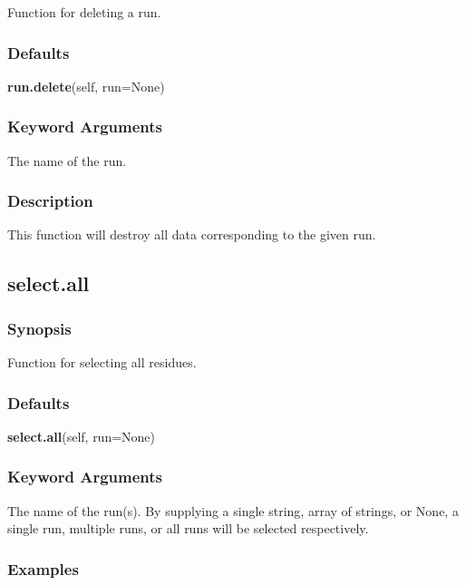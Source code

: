 Function for deleting a run.

\subsubsection{Defaults}

\textsf{\textbf{run.delete}(self, run=None)}


\subsubsection{Keyword Arguments}


  The name of the run.

\subsubsection{Description}

This function will destroy all data corresponding to the given run.


\newpage

\subsection{select.all}


\subsubsection{Synopsis}

Function for selecting all residues.

\subsubsection{Defaults}

\textsf{\textbf{select.all}(self, run=None)}


\subsubsection{Keyword Arguments}


  The name of the run(s).  By supplying a single string, array of strings, or None, a single run, multiple runs, or all runs will be selected respectively.

\subsubsection{Examples}

